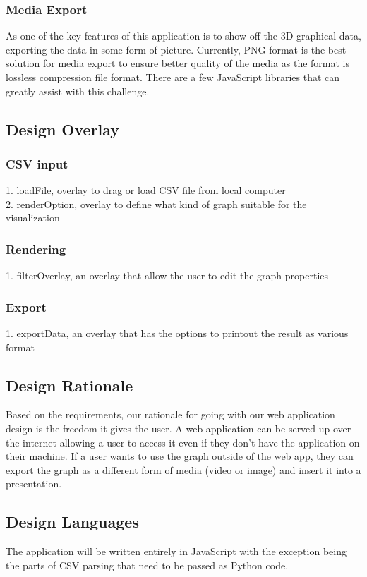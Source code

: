 \documentclass[journal,10pt,onecolumn,compsoc]{IEEEtran} \usepackage[margin=1.0in]{geometry} \usepackage{pdfpages}
\begin{document}
        \subsubsection{Media Export}
        As one of the key features of this application is to show off the 3D graphical data, exporting the data in some form of picture. Currently, PNG format is the best solution for media export to ensure better quality of the media as the format is lossless compression file format. There are a few JavaScript libraries that can greatly assist with this challenge. 

    \subsection{Design Overlay}
        \subsubsection{CSV input}
        1. loadFile, overlay to drag or load CSV file from local computer\\
        2. renderOption, overlay to define what kind of graph suitable for the visualization
        
        \subsubsection{Rendering}
        1. filterOverlay, an overlay that allow the user to edit the graph properties
        
        \subsubsection{Export}
        1. exportData, an overlay that has the options to printout the result as various format
        
    \subsection{Design Rationale}
    Based on the requirements, our rationale for going with our web application design is the freedom it gives the user. A web application can be served up over the internet allowing a user to access it even if they don't have the application on their machine. If a user wants to use the graph outside of the web app, they can export the graph as a different form of media (video or image) and insert it into a presentation.
    \subsection{Design Languages}
    The application will be written entirely in JavaScript with the exception being the parts of CSV parsing that need to be passed as Python code. 
\end{document}
